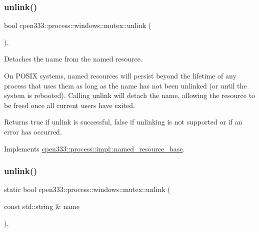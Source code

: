 \subsubsection{\texorpdfstring{unlink()}{unlink()}\hspace{0.1cm}{\footnotesize\ttfamily [1/2]}}
{\footnotesize\ttfamily bool cpen333\+::process\+::windows\+::mutex\+::unlink (\begin{DoxyParamCaption}{ }\end{DoxyParamCaption})\hspace{0.3cm}{\ttfamily [inline]}, {\ttfamily [virtual]}}



Detaches the name from the named resource. 

On P\+O\+S\+IX systems, named resources will persist beyond the lifetime of any process that uses them as long as the name has not been unlinked (or until the system is rebooted). Calling {\ttfamily unlink} will detach the name, allowing the resource to be freed once all current users have exited.

\begin{DoxyReturn}{Returns}
{\ttfamily true} if unlink is successful, {\ttfamily false} if unlinking is not supported or if an error has occurred. 
\end{DoxyReturn}


Implements \hyperlink{classcpen333_1_1process_1_1impl_1_1named__resource__base_ae4033f82dfd068b917a9bca57d3a0c45}{cpen333\+::process\+::impl\+::named\+\_\+resource\+\_\+base}.

\mbox{\label{classcpen333_1_1process_1_1windows_1_1mutex_aa5a57e9c9c3fdb82bc69c8d1c68ddbfd}} 
\subsubsection{\texorpdfstring{unlink()}{unlink()}\hspace{0.1cm}{\footnotesize\ttfamily [2/2]}}
{\footnotesize\ttfamily static bool cpen333\+::process\+::windows\+::mutex\+::unlink (\begin{DoxyParamCaption}\item[{const std\+::string \&}]{name }\end{DoxyParamCaption})\hspace{0.3cm}{\ttfamily [inline]}, {\ttfamily [static]}}



